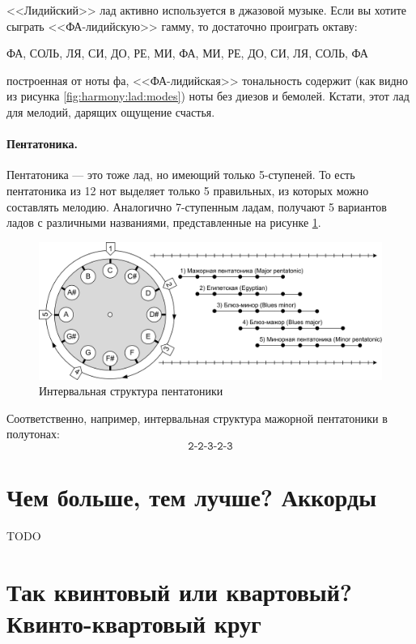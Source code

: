 <<Лидийский>> лад активно используется в джазовой музыке. Если вы хотите сыграть <<ФА-лидийскую>> гамму, то достаточно проиграть октаву:
\begin{center}
    ФА, СОЛЬ, ЛЯ, СИ, ДО, РЕ, МИ, ФА, МИ, РЕ, ДО, СИ, ЛЯ, СОЛЬ, ФА
\end{center}
 
построенная от ноты фа, <<ФА-лидийская>> тональность содержит (как видно из рисунка \ref{fig:harmony:lad:modes}) ноты без диезов и бемолей. Кстати, этот лад для мелодий, дарящих ощущение счастья.

\paragraph{Пентатоника.} Пентатоника --- это тоже лад, но имеющий только 5-ступеней. То есть пентатоника из 12 нот выделяет только 5 правильных, из которых можно составлять мелодию. Аналогично 7-ступенным ладам, получают 5 вариантов ладов с различными названиями, представленные на рисунке \ref{fig:harmony:lad:pentatonic}.

\begin{figure}[!ht]
    \centering
    \includegraphics[width=\textwidth]{fig/intervals/pentatonic} 
    \caption{Интервальная структура пентатоники}\label{fig:harmony:lad:pentatonic}
\end{figure} 

Соответственно, например, интервальная структура мажорной пентатоники в полутонах:
\[
    \texttt{2-2-3-2-3}
\]


\section{Чем больше, тем лучше? Аккорды}
\label{ch:harmony:chords}

TODO

\section{Так квинтовый или квартовый? Квинто-квартовый круг}
\label{ch:harmony:kvinto-kvarto-round}

